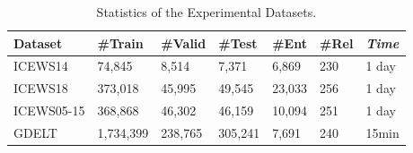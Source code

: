 \documentclass[sigconf,natbib=true]{acmart}
\begin{document}
\begin{table}
	\centering
 \small
	\caption{Statistics of the Experimental Datasets.}
 \vspace{-0.2cm}
	\begin{tabular}{lllllll}
		\hline
		Dataset     & \#Train & \#Valid & \#Test &\#Ent &\#Rel  &\emph{Time}\\
		\hline
		ICEWS14       & 74,845  & 8,514     &7,371 &6,869 & 230 & 1 day\\
		ICEWS18       & 373,018 & 45,995      & 49,545 &23,033 & 256&  1 day\\
         ICEWS05-15  & 368,868 & 46,302     & 46,159 &10,094& 251&  1 day\\
         GDELT       & 1,734,399 & 238,765     & 305,241&7,691& 240& 15min\\

		\hline
	\end{tabular}
	\vspace{-0.4cm}
	\label{tab:plain}
\end{table}	
\end{document}
